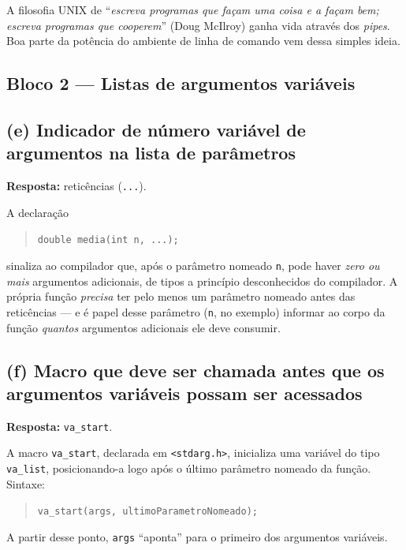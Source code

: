 \documentclass[11pt,a4paper]{article}
\begin{document}
\begin{obseng}
A filosofia UNIX de ``\emph{escreva programas que fa\c{c}am uma coisa e a fa\c{c}am bem; escreva programas que cooperem}'' (Doug McIlroy) ganha vida atrav\'es dos \emph{pipes}. Boa parte da pot\^encia do ambiente de linha de comando vem dessa simples ideia.
\end{obseng}

\subsection*{Bloco 2 --- Listas de argumentos vari\'aveis}

\subsection*{(e) Indicador de n\'umero vari\'avel de argumentos na lista de par\^ametros}

\begin{resposta}\textbf{Resposta:} retic\^encias (\texttt{...}).\end{resposta}

A declara\c{c}\~ao
\begin{quote}\texttt{double media(int n, ...);}\end{quote}
sinaliza ao compilador que, ap\'os o par\^ametro nomeado \texttt{n}, pode haver \emph{zero ou mais} argumentos adicionais, de tipos a princ\'ipio desconhecidos do compilador. A pr\'opria fun\c{c}\~ao \emph{precisa} ter pelo menos um par\^ametro nomeado antes das retic\^encias --- e \'e papel desse par\^ametro (\texttt{n}, no exemplo) informar ao corpo da fun\c{c}\~ao \emph{quantos} argumentos adicionais ele deve consumir.

\subsection*{(f) Macro que deve ser chamada antes que os argumentos vari\'aveis possam ser acessados}

\begin{resposta}\textbf{Resposta:} \texttt{va\_start}.\end{resposta}

A macro \texttt{va\_start}, declarada em \texttt{<stdarg.h>}, inicializa uma vari\'avel do tipo \texttt{va\_list}, posicionando-a logo ap\'os o \'ultimo par\^ametro nomeado da fun\c{c}\~ao. Sintaxe:
\begin{quote}\texttt{va\_start(args, ultimoParametroNomeado);}\end{quote}
A partir desse ponto, \texttt{args} ``aponta'' para o primeiro dos argumentos vari\'aveis.
\end{document}
